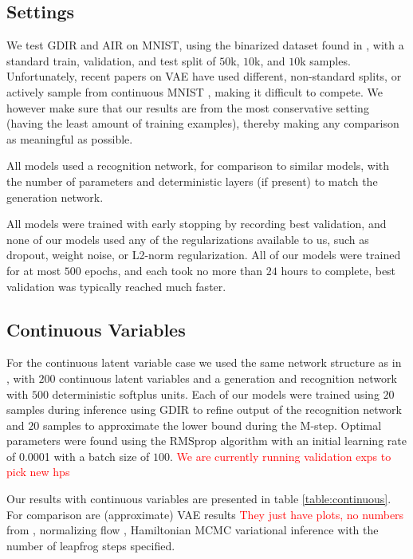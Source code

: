 \documentclass{article} %
\newcommand{\alert}[1]{\textcolor{red}{#1}}
\begin{document}
\subsection{Settings}

We test GDIR and AIR on MNIST, using the binarized dataset found in \citep{salakhutdinov2008quantitative}, with a standard train, validation, and test split of $50$k, $10$k, and $10$k samples. Unfortunately, recent papers on VAE \citep{mnih2014neural, salimans2014markov} have used different, non-standard splits, or actively sample from continuous MNIST \citep{burda2015importance}, making it difficult to compete. We however make sure that our results are from the most conservative setting (having the least amount of training examples), thereby making any comparison as meaningful as possible.

All models used a recognition network, for comparison to similar models, with the number of parameters and deterministic layers (if present) to match the generation network.

All models were trained with early stopping by recording best validation, and none of our models used any of the regularizations available to us, such as dropout, weight noise, or L2-norm regularization. All of our models were trained for at most $500$ epochs, and each took no more than $24$ hours to complete, best validation was typically reached much faster.

\subsection{Continuous Variables}
For the continuous latent variable case we used the same network structure as in \citep{kingma2013auto, salimans2014markov}, with $200$ continuous latent variables and a generation and recognition network with $500$ deterministic softplus units. Each of our models were trained using $20$ samples during inference using GDIR to refine output of the recognition network and $20$ samples to approximate the lower bound during the M-step. Optimal parameters were found using the RMSprop algorithm \citep{Hinton-Coursera2012} with an initial learning rate of \num{0.0001} with a batch size of $100$. \alert{We are currently running validation exps to pick new hps}

Our results with continuous variables are presented in table \ref{table:continuous}. For comparison are (approximate) VAE results \alert{They just have plots, no numbers} from \citep{kingma2013auto}, normalizing flow \citep{rezende2015variational}, Hamiltonian MCMC variational inference \citep{salimans2014markov} with the number of leapfrog steps specified.
\end{document}
